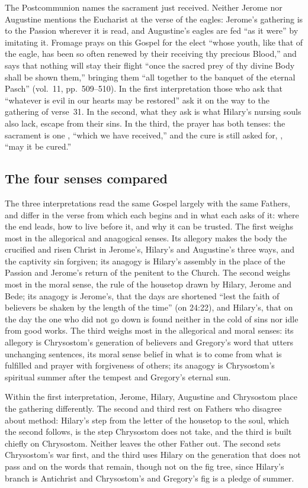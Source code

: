 The Postcommunion names the sacrament just received. Neither Jerome nor
Augustine mentions the Eucharist at the verse of the eagles: Jerome's
gathering is to the Passion wherever it is read, and Augustine's eagles are
fed ``as it were'' by imitating it. Fromage prays on this Gospel for the elect
``whose youth, like that of the eagle, has been so often renewed by their
receiving thy precious Blood,'' and says that nothing will stay their flight
``once the sacred prey of thy divine Body shall be shown them,'' bringing them
``all together to the banquet of the eternal Pasch'' (vol.~11, pp.~509--510).
In the first interpretation those who ask that ``whatever is evil in our
hearts may be restored'' ask it on the way to the gathering of verse~31. In
the second, what they ask is what Hilary's nursing souls also lack, escape
from their sins. In the third, the prayer has both tenses: the sacrament is
one , ``which we have received,'' and the cure is still
asked for, , ``may it be cured.''

\subsection{The four senses compared}

The three interpretations read the same Gospel largely with the same Fathers,
and differ in the verse from which each begins and in what each asks of it:
where the end leads, how to live before it, and why it can be trusted. The first weighs
most in the allegorical and anagogical senses. Its allegory makes the body
the crucified and risen Christ in Jerome's, Hilary's and Augustine's three
ways, and the captivity sin forgiven; its anagogy is Hilary's assembly in the
place of the Passion and Jerome's return of the penitent to the Church. The
second weighs most in the moral sense, the rule of the housetop drawn by
Hilary, Jerome and Bede; its anagogy is Jerome's, that the days are shortened
``lest the faith of believers be shaken by the length of the time'' (on
24:22), and Hilary's, that on the day the one who did not go down is found
neither in the cold of sins nor idle from good works. The third weighs most
in the allegorical and moral senses: its allegory is Chrysostom's generation
of believers and Gregory's word that utters unchanging sentences, its moral
sense belief in what is to come from what is fulfilled and prayer with
forgiveness of others; its anagogy is Chrysostom's spiritual summer after the
tempest and Gregory's eternal sun.

Within the first interpretation, Jerome, Hilary, Augustine and Chrysostom place the gathering
differently. The second and third rest on Fathers who disagree about
method: Hilary's step from the letter of the housetop to the soul, which the
second follows, is the step Chrysostom does not take, and the third is built
chiefly on Chrysostom. Neither leaves the other Father out. The second sets
Chrysostom's war first, and the third uses Hilary on the generation that does
not pass and on the words that remain, though not on the fig tree, since
Hilary's branch is Antichrist and Chrysostom's and Gregory's fig is a pledge
of summer.
